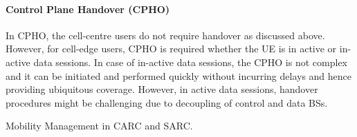 \documentclass[article,10pt,twocolumn]{IEEEtran}
\begin{document}
\paragraph{Control Plane Handover (CPHO)}
In CPHO, the cell-centre users do not require handover as discussed above. However, for cell-edge users, CPHO is required whether the UE is in active or in-active data sessions. In case of in-active data sessions, the CPHO is not complex and it can be initiated and performed quickly without incurring delays and hence providing ubiquitous coverage. However, in active data sessions, handover procedures might be challenging due to decoupling of control and data BSs.
\begin{table}[!htb]
\renewcommand{\arraystretch}{1.5}
\centering
\caption{Mobility Management in CARC and SARC.}\label{Table:mm}
\begin{tcolorbox}[tab4, title = Quick View of Mobility Management, boxrule=0.3mm,top=0.3mm,bottom=0.3mm,left=0.3mm,right=0.3mm,
rightrule=0.3mm]


\end{tcolorbox}
\end{table}
\end{document}
